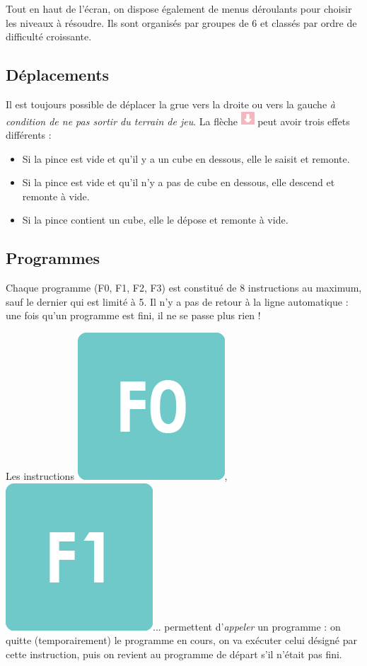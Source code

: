 \documentclass[a4paper,11pt]{article}
\begin{document}
\medskip

Tout en haut de l'écran, on dispose également de menus déroulants pour
choisir les niveaux à résoudre. Ils sont organisés par groupes de 6 et
classés par ordre de difficulté croissante.

\subsection*{Déplacements}
\vspace{-0.2cm}

Il est toujours possible de d\'eplacer la grue vers la droite ou vers
la gauche \emph{à condition de ne pas sortir du terrain de jeu}.
%
La flèche \includegraphics[width=0.5cm]{down} peut avoir trois
effets différents :
\begin{itemize}
\item Si la pince est vide et qu'il y a un cube en dessous, elle
  le saisit et remonte.
\item Si la pince est vide et qu'il n'y a pas de cube en dessous, elle
  descend et remonte \`a vide.
\item Si la pince contient un cube, elle le d\'epose et remonte
  \`a vide.
\end{itemize}


\subsection*{Programmes}

Chaque programme (F0, F1, F2, F3) est constitué de 8 instructions au
maximum, sauf le dernier qui est limité à 5.
Il n'y a pas de \og retour à la ligne \fg{} automatique : une fois
qu'un programme est fini, il ne se passe plus rien !



Les instructions \includegraphics[width
=.5cm]{f0},  \includegraphics[width=.5cm]{f1}... permettent
d'\emph{appeler} un programme : on quitte (temporairement) le programme
en cours, on va exécuter celui désigné par cette instruction, puis on
revient au programme de départ s'il n'était pas fini.
\end{document}

